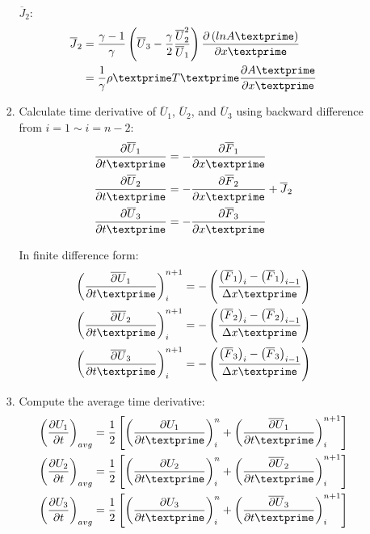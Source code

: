 \documentclass[12pt]{article}
\begin{document}
\begin{enumerate}
\begin{enumerate}
\begin{enumerate}
\begin{align}
				\end{align}
				\par $\overline{J}_{2}$:
				\begin{align}
					\overline{J}_{2} 	&= \frac{\gamma - 1}{\gamma}\left(\overline{U}_{3} - \frac{\gamma}{2}\frac{\overline{U}_{2}^{2}}{\overline{U}_{1}}\right)\frac{\partial\left(ln A\textprime\right)}{\partial x\textprime} \\
						&= \frac{1}{\gamma}\rho\textprime T\textprime\frac{\partial A\textprime}{\partial x\textprime}
				\end{align}
			\item Calculate time derivative of $\overline{U}_1$, $\overline{U}_2$, and $\overline{U}_3$ using backward difference from $i = 1 \sim i = n - 2$:
				\begin{align}
					\frac{\partial \overline{U}_1}{\partial t\textprime} &= - \frac{\partial \overline{F}_1}{\partial x\textprime}\\
					\frac{\partial \overline{U}_2}{\partial t\textprime} &= - \frac{\partial \overline{F}_2}{\partial x\textprime} + \overline{J}_2\\
					\frac{\partial \overline{U}_3}{\partial t\textprime} &= - \frac{\partial \overline{F}_3}{\partial x\textprime}
				\end{align}
				\par In finite difference form:
				\begin{align}
					\left(\frac{\overline{\partial U}_1}{\partial t\textprime}\right)_{i}^{n+1} &= -\left(\frac{\left(\overline{F}_{1}\right)_{i} - \left(\overline{F}_{1}\right)_{i-1}}{\Delta x\textprime}\right) \\
					\left(\frac{\overline{\partial U}_2}{\partial t\textprime}\right)_{i}^{n+1} &= -\left(\frac{\left(\overline{F}_{2}\right)_{i} - \left(\overline{F}_{2}\right)_{i-1}}{\Delta x\textprime}\right) \\
					\left(\frac{\overline{\partial U}_3}{\partial t\textprime}\right)_{i}^{n+1} &= -\left(\frac{\left(\overline{F}_{3}\right)_{i} - \left(\overline{F}_{3}\right)_{i-1}}{\Delta x\textprime}\right) 
				\end{align}
			\item Compute the average time derivative:
				\begin{align}
					\left(\frac{\partial U_{1}}{\partial t}\right)_{avg} &= \frac{1}{2}\left[\left(\frac{\partial U_{1}}{\partial t\textprime}\right)_{i}^{n} + \left(\frac{\overline{\partial U}_{1}}{\partial t\textprime}\right)_{i}^{n+1} \right] \\
					\left(\frac{\partial U_{2}}{\partial t}\right)_{avg} &= \frac{1}{2}\left[\left(\frac{\partial U_{2}}{\partial t\textprime}\right)_{i}^{n} + \left(\frac{\overline{\partial U}_{2}}{\partial t\textprime}\right)_{i}^{n+1} \right] \\
					\left(\frac{\partial U_{3}}{\partial t}\right)_{avg} &= \frac{1}{2}\left[\left(\frac{\partial U_{3}}{\partial t\textprime}\right)_{i}^{n} + \left(\frac{\overline{\partial U}_{3}}{\partial t\textprime}\right)_{i}^{n+1} \right] 
				\end{align}


\end{enumerate}
\end{enumerate}
\end{enumerate}
\end{document}
